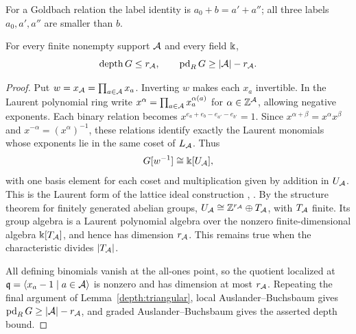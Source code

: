 For a Goldbach relation the label identity is $a_0+b=a'+a''$;
all three labels $a_0,a',a''$ are smaller than $b$.

\begin{proposition}\label{depth:relation-group-bound}
For every finite nonempty support $\mathcal A$ and every field $\Bbbk$,
\[
 \operatorname{depth}G\le r_{\mathcal A},\qquad
 \operatorname{pd}_{R}G\ge|\mathcal A|-r_{\mathcal A}.
\]
\end{proposition}
\begin{proof}
Put $w=x_{\mathcal A}=\prod_{a\in\mathcal A}x_a$. Inverting $w$ makes each $x_a$
invertible. In the Laurent polynomial ring write
$x^\alpha=\prod_{a\in\mathcal A}x_a^{\alpha(a)}$ for $\alpha\in\mathbb Z^{\mathcal A}$,
allowing negative exponents. Each binary relation becomes
$x^{e_a+e_b-e_{a'}-e_{b'}}=1$. Since $x^{\alpha+\beta}=x^\alpha x^\beta$
and $x^{-\alpha}=(x^\alpha)^{-1}$, these relations identify exactly
the Laurent monomials whose exponents lie in the same coset of $L_{\mathcal A}$.
Thus
\[
 G[w^{-1}]\cong\Bbbk[U_{\mathcal A}],
\]
with one basis element for each coset and multiplication given by
addition in $U_{\mathcal A}$. This is the Laurent form of the lattice
ideal construction \cite[Theorem~2.1]{ES96}, \cite[\S7.1]{MS05}.
By the structure theorem for finitely generated abelian groups,
$U_{\mathcal A}\cong\mathbb Z^{r_{\mathcal A}}\oplus T_{\mathcal A}$, with $T_{\mathcal A}$ finite.
Its group algebra is a Laurent polynomial algebra over the nonzero
finite-dimensional algebra $\Bbbk[T_{\mathcal A}]$, and hence has dimension $r_{\mathcal A}$.
This remains true when the characteristic divides $|T_{\mathcal A}|$.

All defining binomials vanish at the all-ones point, so the quotient
localized at $\mathfrak q=\langle x_a-1\mid a\in\mathcal A\rangle$ is nonzero and has dimension
at most $r_{\mathcal A}$. Repeating the final argument of
Lemma~\ref{depth:triangular}, local
Auslander--Buchsbaum gives $\operatorname{pd}_{R}G\ge|\mathcal A|-r_{\mathcal A}$, and graded
Auslander--Buchsbaum gives the asserted depth bound.
\end{proof}

